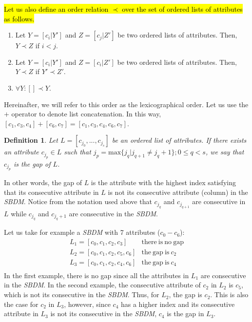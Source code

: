 \documentclass[number,preprint,review,12pt]{elsarticle}
\newtheorem{definition}{Definition}
\begin{document}
	\hl{Let us also define an order relation $\prec$ over the set of ordered lists of attributes as follows.}
	\begin{enumerate}
		\item Let $Y=[c_i|Y']$ and $Z=[c_j|Z']$ be two ordered lists of attributes. Then, $Y \prec Z$ if $i<j$.
		\item Let $Y=[c_i|Y']$ and $Z=[c_i|Z']$ be two ordered lists of attributes. Then, $Y \prec Z$ if $Y' \prec Z'$.
		\item $\forall Y:  [] \prec Y$.
	\end{enumerate}
	Hereinafter, we will refer to this order as the lexicographical order. Let us use the $+$ operator to denote list concatenation. In this way, $[c_1,c_3,c_4]+[c_6,c_7]=[c_1,c_3,c_4,c_6,c_7]$.
		
	
	\begin{definition}\label{def:gap}
		Let $L = [c_{j_0},...,c_{j_s}]$ be an ordered list of attributes. If there exists an attribute $c_{j_p} \in L$ such that ${j_p}=\mathrm{max}\{j_q | j_{q+1} \neq j_q+1\}; 0 \leq q < s$, we say that $c_{j_p}$ is the gap of $L$.
	\end{definition}
	
	In other words, the gap of $L$ is the attribute with the highest index satisfying that its consecutive attribute in $L$ is not its consecutive attribute (column) in the \textit{SBDM}. Notice from the notation used above that $c_{j_q}$ and $c_{j_{q+1}}$ are consecutive in $L$ while $c_{j_q}$ and $c_{j_q+1}$ are consecutive in the \textit{SBDM}.
	
	Let us take for example a \textit{SBDM} with 7 attributes ($c_0 - c_6$):
	$$\begin{array}{ll}
	{L_1=[c_0,c_1,c_2,c_3]} 		& \mathrm{there~is~no~gap}\\
	{L_2=[c_0,c_1,c_2,c_5,c_6]} 	& \mathrm{the~gap~is~} c_2\\
	{L_3=[c_0,c_1,c_2,c_4,c_6]} 	& \mathrm{the~gap~is~} c_4\\
	\end{array}$$
	In the first example, there is no gap since all the attributes in $L_1$ are consecutive in the \textit{SBDM}. In the second example, the consecutive attribute of $c_2$ in $L_2$ is $c_5$, which is not its consecutive in the \textit{SBDM}. Thus, for $L_2$, the gap is $c_2$. This is also the case for $c_2$ in $L_3$, however, since $c_4$ has a higher index and its consecutive attribute in $L_3$ is not its consecutive in the \textit{SBDM}, $c_4$ is the gap in $L_3$.
\end{document}
